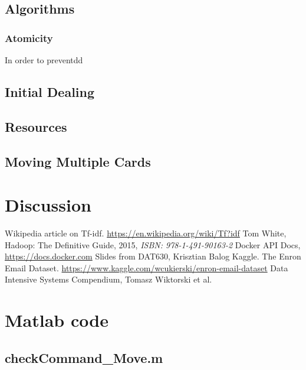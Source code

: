 \documentclass[runningheads,a4paper]{llncs}
\newcommand{\GPenSIM}{../GPenSIM}
\begin{document}
\subsection{Algorithms}
\subsubsection{Atomicity}
In order to preventdd
\subsection{Initial Dealing}
\subsection{Resources}
\subsection{Moving Multiple Cards}

\section{Discussion}



\begin{thebibliography}{6}

 Wikipedia article on Tf-idf. \url{https://en.wikipedia.org/wiki/Tf?idf}
 Tom White, Hadoop: The Definitive Guide, 2015, \emph{ISBN: 978-1-491-90163-2}
 Docker API Docs, \url{https://docs.docker.com}
 Slides from DAT630, Krisztian Balog
 Kaggle. The Enron Email Dataset. \url{https://www.kaggle.com/wcukierski/enron-email-dataset}
 Data Intensive Systems Compendium, Tomasz Wiktorski et al.

\end{thebibliography}

\appendix
\section{Matlab code}	
\subsection{checkCommand\_Move.m}
\label{app:checkCommand_Move.m}

\end{document}
